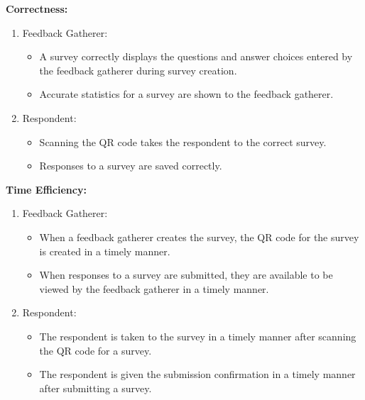 \documentclass[letterpaper, 12 pt, conference]{ieeeconf}
\begin{document}
\textbf{Correctness:}
\begin{enumerate}
    \item[] Feedback Gatherer:
    \begin{itemize}
        \item A survey correctly displays the questions and answer choices entered by the feedback gatherer during survey creation. 
        \item Accurate statistics for a survey are shown to the feedback gatherer.
    \end{itemize}
    \item[] Respondent:
    \begin{itemize}
        \item Scanning the QR code takes the respondent to the correct survey.
        \item Responses to a survey are saved correctly.
    \end{itemize}
\end{enumerate}
\hfill \break

\textbf{Time Efficiency:}
\begin{enumerate}
    \item[] Feedback Gatherer:
    \begin{itemize}
        \item  When a feedback gatherer creates the survey, the QR code for the survey is created in a timely manner.
        \item When responses to a survey are submitted, they are available to be viewed by the feedback gatherer in a timely manner.
    \end{itemize}
    \item[] Respondent:
    \begin{itemize}
        \item The respondent is taken to the survey in a timely manner after scanning the QR code for a survey.
        \item The respondent is given the submission confirmation in a timely manner after submitting a survey.
    \end{itemize}
\end{enumerate}

\hfill \break
\newpage
\end{document}
